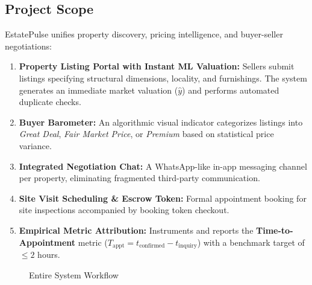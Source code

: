 \documentclass[11pt,a4paper]{article}
\begin{document}
\subsection{Project Scope}
EstatePulse unifies property discovery, pricing intelligence, and buyer-seller negotiations:
\begin{enumerate}[leftmargin=0.8cm]
    \item \textbf{Property Listing Portal with Instant ML Valuation:} Sellers submit listings specifying structural dimensions, locality, and furnishings. The system generates an immediate market valuation ($\hat{y}$) and performs automated duplicate checks.
    \item \textbf{Buyer Barometer:} An algorithmic visual indicator categorizes listings into \textit{Great Deal}, \textit{Fair Market Price}, or \textit{Premium} based on statistical price variance.
    \item \textbf{Integrated Negotiation Chat:} A WhatsApp-like in-app messaging channel per property, eliminating fragmented third-party communication.
    \item \textbf{Site Visit Scheduling \& Escrow Token:} Formal appointment booking for site inspections accompanied by booking token checkout.
    \item \textbf{Empirical Metric Attribution:} Instruments and reports the \textbf{Time-to-Appointment} metric ($T_{\text{appt}} = t_{\text{confirmed}} - t_{\text{inquiry}}$) with a benchmark target of $\le 2$ hours.
\end{enumerate}

\begin{figure}[htbp]
\centering
{}
\caption{Entire System Workflow}
\label{fig:workflow}
\end{figure}
\end{document}
